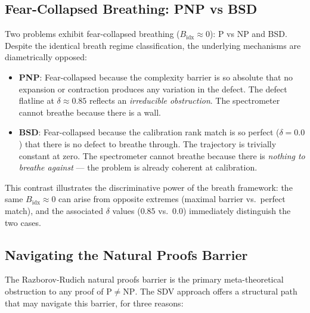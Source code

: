 \documentclass[11pt]{article}
\theoremstyle{definition}
\theoremstyle{remark}
\begin{document}
\subsection{Fear-Collapsed Breathing: PNP vs BSD}

Two problems exhibit fear-collapsed breathing ($B_{\mathrm{idx}} \approx 0$):
P vs NP and BSD.  Despite the identical breath regime classification, the
underlying mechanisms are diametrically opposed:

\begin{itemize}[nosep]
  \item \textbf{PNP}: Fear-collapsed because the complexity barrier is so
    absolute that no expansion or contraction produces any variation in the
    defect.  The defect flatline at $\delta \approx 0.85$ reflects an
    \emph{irreducible obstruction}.  The spectrometer cannot breathe because
    there is a wall.

  \item \textbf{BSD}: Fear-collapsed because the calibration rank match is
    so perfect ($\delta = 0.0$) that there is no defect to breathe through.
    The trajectory is trivially constant at zero.  The spectrometer cannot
    breathe because there is \emph{nothing to breathe against} --- the
    problem is already coherent at calibration.
\end{itemize}

\noindent
This contrast illustrates the discriminative power of the breath framework:
the same $B_{\mathrm{idx}} \approx 0$ can arise from opposite extremes
(maximal barrier vs.\ perfect match), and the associated $\delta$ values
($0.85$ vs.\ $0.0$) immediately distinguish the two cases.

\subsection{Navigating the Natural Proofs Barrier}

The Razborov-Rudich natural proofs barrier \cite{RR} is the primary
meta-theoretical obstruction to any proof of $\mathrm{P} \neq \mathrm{NP}$.
The SDV approach offers a structural path that may navigate this barrier,
for three reasons:
\end{document}
